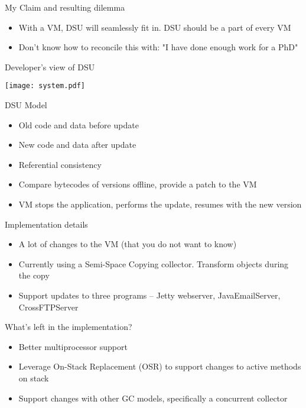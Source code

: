\documentclass[xcolor=dvipsnames]{beamer}
\begin{document}
\begin{frame}{My Claim and resulting dilemma}%
\begin{itemize}
\item With a VM, DSU will seamlessly fit in. DSU should be a part of every
VM
\item Don't know how to reconcile this with: "I have done enough work for a
PhD"
\end{itemize}
\end{frame}

\begin{frame}{Developer's view of DSU}%
\begin{center}
\texttt{[image: system.pdf]}
\end{center}
\end{frame}

\begin{frame}{DSU Model}%
\begin{itemize}
\item Old code and data before update
\item New code and data after update
\item Referential consistency
\item Compare bytecodes of versions offline, provide a patch to the VM
\item VM stops the application, performs the update, resumes with the new
version
\end{itemize}
\end{frame}

\begin{frame}{Implementation details}%
\begin{itemize}
\item A lot of changes to the VM (that you do not want to know)
\item Currently using a Semi-Space Copying collector. Transform objects
during the copy
\item Support updates to three programs -- Jetty webserver,
JavaEmailServer, CrossFTPServer
\end{itemize}
\end{frame}

\begin{frame}{What's left in the implementation?}%
\begin{itemize}
\item Better multiprocessor support
\item Leverage On-Stack Replacement (OSR) to support changes to active
methods on stack
\item Support changes with other GC models, specifically a concurrent
collector
\end{itemize}
\end{frame}
\end{document}
